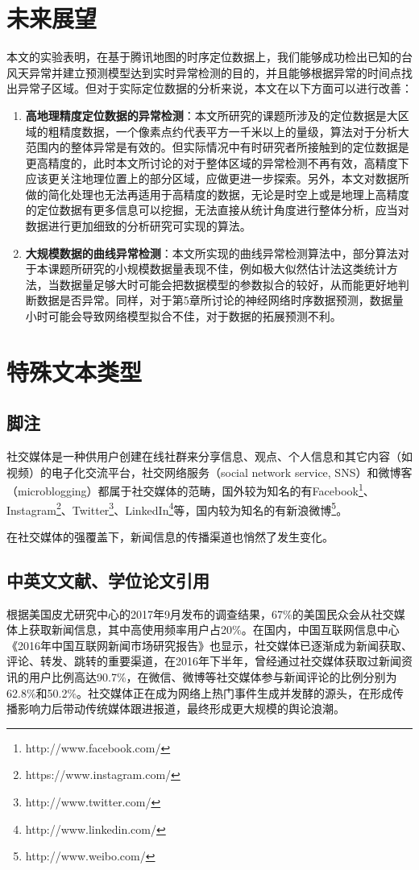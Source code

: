 \documentclass[a4paper,AutoFakeBold,oneside,12pt]{book}
\begin{document}
\section{未来展望}
本文的实验表明，在基于腾讯地图的时序定位数据上，我们能够成功检出已知的台风天异常并建立预测模型达到实时异常检测的目的，并且能够根据异常的时间点找出异常子区域。但对于实际定位数据的分析来说，本文在以下方面可以进行改善：
\begin{enumerate}
\item \textbf{高地理精度定位数据的异常检测}：本文所研究的课题所涉及的定位数据是大区域的粗精度数据，一个像素点约代表平方一千米以上的量级，算法对于分析大范围内的整体异常是有效的。但实际情况中有时研究者所接触到的定位数据是更高精度的，此时本文所讨论的对于整体区域的异常检测不再有效，高精度下应该更关注地理位置上的部分区域，应做更进一步探索。另外，本文对数据所做的简化处理也无法再适用于高精度的数据，无论是时空上或是地理上高精度的定位数据有更多信息可以挖掘，无法直接从统计角度进行整体分析，应当对数据进行更加细致的分析研究可实现的算法。
\item \textbf{大规模数据的曲线异常检测}：本文所实现的曲线异常检测算法中，部分算法对于本课题所研究的小规模数据量表现不佳，例如极大似然估计法这类统计方法，当数据量足够大时可能会把数据模型的参数拟合的较好，从而能更好地判断数据是否异常。同样，对于第5章所讨论的神经网络时序数据预测，数据量小时可能会导致网络模型拟合不佳，对于数据的拓展预测不利。
\end{enumerate}

\section{特殊文本类型}
\subsection{脚注}
社交媒体是一种供用户创建在线社群来分享信息、观点、个人信息和其它内容（如视频）的电子化交流平台，社交网络服务（social network service, SNS）和微博客（microblogging）都属于社交媒体的范畴\cite{webster_social_media}，国外较为知名的有Facebook\footnote{http://www.facebook.com/}、Instagram\footnote{https://www.instagram.com/}、Twitter\footnote{http://www.twitter.com/}、LinkedIn\footnote{http://www.linkedin.com/}等，国内较为知名的有新浪微博\footnote{http://www.weibo.com/}。

在社交媒体的强覆盖下，新闻信息的传播渠道也悄然了发生变化。\cite{false_news_spread_2018}



\subsection{中英文文献、学位论文引用}
根据美国皮尤研究中心的2017年9月发布的调查结果\cite{pew_news_use_2017}，67\%的美国民众会从社交媒体上获取新闻信息，其中高使用频率用户占20\%。在国内，中国互联网信息中心《2016年中国互联网新闻市场研究报告》\cite{internet_news_2016}也显示，社交媒体已逐渐成为新闻获取、评论、转发、跳转的重要渠道，在2016年下半年，曾经通过社交媒体获取过新闻资讯的用户比例高达90.7\%，在微信、微博等社交媒体参与新闻评论的比例分别为62.8\%和50.2\%。社交媒体正在成为网络上热门事件生成并发酵的源头，在形成传播影响力后带动传统媒体跟进报道，最终形成更大规模的舆论浪潮。
\end{document}
